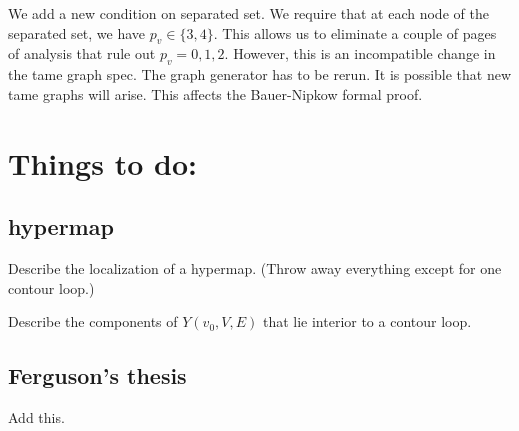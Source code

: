 We add a new condition on separated set.  We require that 
at each node of the separated set, we have $p_v\in\{3,4\}$.
This allows us to eliminate a couple of pages of analysis
that rule out $p_v=0,1,2$.  However, this is an incompatible
change in the tame graph spec.  The graph generator has to
be rerun.  It is possible that new tame graphs will arise.
This affects the Bauer-Nipkow formal proof.

\section{Things to do:}

\subsection{hypermap}
Describe the localization of a hypermap.  (Throw away everything
except for one contour loop.)

Describe the components of $Y(v_0,V,E)$ that lie interior to
a contour loop.  


\subsection{Ferguson's thesis}

Add this.



